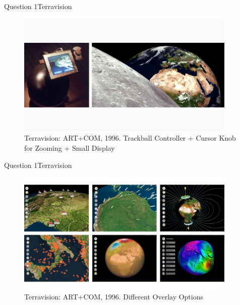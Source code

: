 \documentclass[t,aspectratio=169,divpsnames]{beamer}
\begin{document}
\begin{frame}{Question 1}{Terravision}
    \begin{figure}
    \vspace{-0.1cm}
   	\includegraphics[width=10.5cm]{images/1996_Terravision_06-1360x765.jpg}
        \vspace{-0.9cm}

	\caption{\scriptsize Terravision: ART+COM, 1996. Trackball Controller + Cursor Knob for Zooming + Small Display}
\end{figure}
\end{frame}
\begin{frame}{Question 1}{Terravision}
    \begin{figure}
    \vspace{-0.1cm}
    \includegraphics[width=10.5cm]{images/1996_Terravision_05-1360x765.jpg}
        \vspace{-0.7cm}
	\caption{\scriptsize Terravision: ART+COM, 1996. Different Overlay Options}
\end{figure}
\end{frame}
\end{document}
